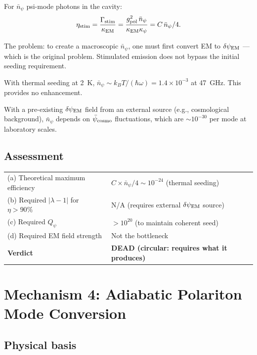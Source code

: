 \documentclass[11pt]{article}
\newcommand{\ee}[1]{\times 10^{#1}}
\newcommand{\dpsiEM}{\delta\psi_{\rm EM}}
\newcommand{\psicosmo}{\bar{\psi}_{\rm cosmo}}
\newcommand{\lambdaone}{|\lambda{-}1|}
\newcommand{\Qpsi}{Q_\psi}
\begin{document}
For $\bar{n}_\psi$ psi-mode photons in the cavity:
\begin{equation}
\eta_{\rm stim} = \frac{\Gamma_{\rm stim}}{\kappa_{\rm EM}}
= \frac{g_{\rm pol}^2\,\bar{n}_\psi}{\kappa_{\rm EM}\kappa_\psi}
= C\,\bar{n}_\psi/4.
\end{equation}

The problem: to create a macroscopic $\bar{n}_\psi$, one must first
convert EM to $\dpsiEM$ --- which is the original problem. Stimulated
emission does not bypass the initial seeding requirement.

With thermal seeding at 2~K, $\bar{n}_\psi \sim k_BT/(\hbar\omega)
= 1.4\ee{-3}$ at 47~GHz. This provides no enhancement.

With a pre-existing $\dpsiEM$ field from an external source (e.g.,
cosmological background), $\bar{n}_\psi$ depends on $\psicosmo$
fluctuations, which are $\sim 10^{-30}$ per mode at laboratory scales.

\subsection{Assessment}

\begin{center}
\begin{tabular}{ll}
\toprule
(a) Theoretical maximum efficiency & $C \times \bar{n}_\psi/4 \sim 10^{-24}$ (thermal seeding) \\
(b) Required $\lambdaone$ for $\eta > 90\%$ & N/A (requires external $\dpsiEM$ source) \\
(c) Required $\Qpsi$ & $>10^{20}$ (to maintain coherent seed) \\
(d) Required EM field strength & Not the bottleneck \\
\midrule
\textbf{Verdict} & \textbf{DEAD (circular: requires what it produces)} \\
\bottomrule
\end{tabular}
\end{center}

\section{Mechanism 4: Adiabatic Polariton Mode Conversion}
\label{sec:mech-adiabatic}

\subsection{Physical basis}
\end{document}

